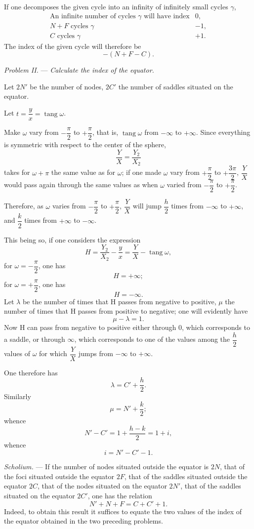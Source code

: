\documentclass[11pt]{article}
\begin{document}
If one decomposes the given cycle into an infinity of infinitely small cycles $\gamma$,
\[
\begin{array}{rcl}
\text{An infinite number of cycles }\gamma\text{ will have index} & 0,\\
N+F\text{ cycles }\gamma & -1,\\
C\text{ cycles }\gamma & +1.
\end{array}
\]
The index of the given cycle will therefore be
\[
-(N+F-C).
\]

\emph{Problem II.} --- \emph{Calculate the index of the equator.}

Let $2N'$ be the number of nodes, $2C'$ the number of saddles situated on the equator.

Let $t=\dfrac yx=\operatorname{tang}\omega$.

Make $\omega$ vary from $-\dfrac\pi2$ to $+\dfrac\pi2$, that is, $\operatorname{tang}\omega$ from $-\infty$ to $+\infty$. Since everything is symmetric with respect to the center of the sphere,
\[
\frac YX=\frac{Y_2}{X_2}
\]
takes for $\omega+\pi$ the same value as for $\omega$; if one made $\omega$ vary from $+\dfrac\pi2$ to $+\dfrac{3\pi}{2}$, $\dfrac YX$ would pass again through the same values as when $\omega$ varied from $-\dfrac\pi2$ to $+\dfrac\pi2$.

Therefore, as $\omega$ varies from $-\dfrac\pi2$ to $+\dfrac\pi2$, $\dfrac YX$ will jump $\dfrac h2$ times from $-\infty$ to $+\infty$, and $\dfrac k2$ times from $+\infty$ to $-\infty$.

This being so, if one considers the expression
\[
H=\frac{Y_2}{X_2}-\frac yx=\frac YX-\operatorname{tang}\omega,
\]
for $\omega=-\dfrac\pi2$, one has
\[
H=+\infty;
\]
for $\omega=+\dfrac\pi2$, one has
\[
H=-\infty.
\]
Let $\lambda$ be the number of times that H passes from negative to positive, $\mu$ the number of times that H passes from positive to negative; one will evidently have
\[
\mu-\lambda=1.
\]
Now H can pass from negative to positive either through 0, which corresponds to a saddle, or through $\infty$, which corresponds to one of the values among the $\dfrac h2$ values of $\omega$ for which $\dfrac YX$ jumps from $-\infty$ to $+\infty$.

One therefore has
\[
\lambda=C'+\frac h2.
\]
Similarly
\[
\mu=N'+\frac k2;
\]
whence
\[
N'-C'=1+\frac{h-k}{2}=1+i,
\]
whence
\[
i=N'-C'-1.
\]

\emph{Scholium.} --- If the number of nodes situated outside the equator is $2N$, that of the foci situated outside the equator $2F$, that of the saddles situated outside the equator $2C$, that of the nodes situated on the equator $2N'$, that of the saddles situated on the equator $2C'$, one has the relation
\[
N'+N+F=C+C'+1.
\]
Indeed, to obtain this result it suffices to equate the two values of the index of the equator obtained in the two preceding problems.
\end{document}
